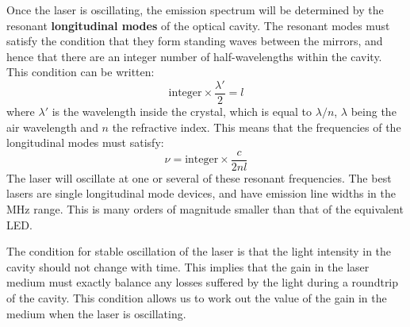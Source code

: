 \documentclass[12pt]{book}
\begin{document}
Once the laser is oscillating, the emission spectrum will be determined by the resonant \textbf{longitudinal modes} of the optical cavity. The resonant modes must satisfy the condition that they form standing waves between the mirrors, and hence that there are an integer number of half-wavelengths within the cavity. This condition can be written:
\begin{equation}\label{equa:5.14}
  \text{integer}\times{\frac{\lambda'}{2}}=l
\end{equation}
where $\lambda'$ is the wavelength inside the crystal, which is equal to $\lambda/n$, $\lambda$ being the air wavelength and $n$ the refractive index. This means that the frequencies of the longitudinal modes must satisfy:
\begin{equation}\label{equa:5.15}
  \nu=\text{integer}\times{\frac{c}{2nl}}
\end{equation}
The laser will oscillate at one or several of these resonant frequencies. The best lasers are single longitudinal mode devices, and have emission line widths in the MHz range. This is many orders of magnitude smaller than that of the equivalent LED.

The condition for stable oscillation of the laser is that the light intensity in the cavity should not change with time. This implies that the gain in the laser medium must exactly balance any losses suffered by the light during a roundtrip of the cavity. This condition allows us to work out the value of the gain in the medium when the laser is oscillating.
\end{document}
